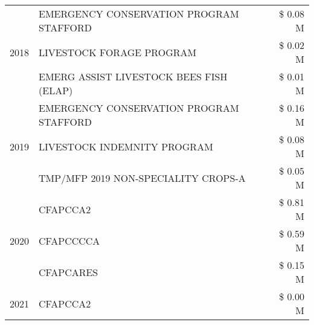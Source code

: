 \begin{tabular}{llr}
\cline{1-3}
\multirow[t]{3}{*}{2018} & EMERGENCY CONSERVATION PROGRAM STAFFORD & \$ 0.08 M \\
 & LIVESTOCK FORAGE PROGRAM & \$ 0.02 M \\
 & EMERG ASSIST LIVESTOCK BEES FISH (ELAP) & \$ 0.01 M \\
\cline{1-3}
\multirow[t]{3}{*}{2019} & EMERGENCY CONSERVATION PROGRAM STAFFORD & \$ 0.16 M \\
 & LIVESTOCK INDEMNITY PROGRAM & \$ 0.08 M \\
 & TMP/MFP 2019 NON-SPECIALITY CROPS-A & \$ 0.05 M \\
\cline{1-3}
\multirow[t]{3}{*}{2020} & CFAPCCA2 & \$ 0.81 M \\
 & CFAPCCCCA & \$ 0.59 M \\
 & CFAPCARES & \$ 0.15 M \\
\cline{1-3}
2021 & CFAPCCA2 & \$ 0.00 M \\
\cline{1-3}
\bottomrule
\end{tabular}
